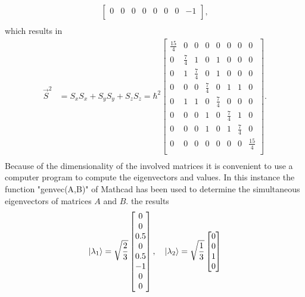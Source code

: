 \begin{example}
\begin{equation}
\begin{split}
\begin{bmatrix}
				0 & 0 & 0 & 0 & 0 & 0 & 0 & -1 \\
			\end{bmatrix}, \\
		\end{split}
	\end{equation} 
	which results in
	\begin{equation}
		\begin{split}
			\vec{S}^2&=S_xS_x+S_yS_y+S_zS_z=\hbar^2\begin{bmatrix}
				\frac{15}{4} & 0 & 0 & 0 & 0 & 0 & 0 & 0 \\
				0 & \frac{7}{4} & 1 & 0 & 1 & 0 & 0 & 0 \\
				0 & 1 & \frac{7}{4} & 0 & 1 & 0 & 0 & 0 \\
				0 & 0 & 0 & \frac{7}{4} & 0 & 1 & 1 & 0 \\
				0 & 1 & 1 & 0 & \frac{7}{4} & 0 & 0 & 0 \\
				0 & 0 & 0 & 1 & 0 & \frac{7}{4} & 1 & 0 \\
				0 & 0 & 0 & 1 & 0 & 1 & \frac{7}{4} & 0 \\
				0 & 0 & 0 & 0 & 0 & 0 & 0 & \frac{15}{4} \\
			\end{bmatrix}. \\
		\end{split}
	\end{equation} 
	Because of the dimensionality of the involved matrices it is convenient to use a computer program to compute the eigenvectors and values. In this instance the function "genvec(A,B)" of Mathcad has been used to determine the simultaneous eigenvectors of matrices $A$ and $B$. the results
	\begin{equation}
		\ket{\lambda_1}=\sqrt{\frac{2}{3}}
		\begin{bmatrix}
			0 \\
			0 \\
			0.5 \\
			0 \\
			0.5 \\
			-1 \\
			0 \\
			0 \\
		\end{bmatrix}, \quad \ket{\lambda_2}=\sqrt{\frac{1}{3}}
		\begin{bmatrix}
			0 \\
			0 \\
			1 \\
			0 \\

\end{bmatrix}
\end{equation}
\end{example}
